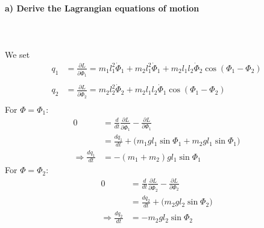 \documentclass[11 pt]{article}
\begin{document}
        \paragraph{a) Derive the Lagrangian equations of motion} \ \\
        \\
        We set 
        \begin{align}
            q_1
            &=\frac{\partial L}{\partial\dot\Phi_1}
            =m_1l_1^2\dot\Phi_1+m_2l_1^2\dot\Phi_1
            +m_2l_1l_2\dot\Phi_2\cos(\Phi_1-\Phi_2) 
            \label{eq:bla} \\
            \\ q_2
            &=\frac{\partial L}{\partial\dot\Phi_2}
            =m_2l_2^2\dot\Phi_2
              +m_2l_1l_2\dot\Phi_1\cos(\Phi_1-\Phi_2) 
            \label{eq:blu} \\
        \end{align}
        For $\Phi=\Phi_1$:
        \begin{align}
            0
            &=\frac{d}{dt}\frac{\partial L}{\partial\dot\Phi_1}
            -\frac{\partial L}{\partial\Phi_1} \\
            &=\frac{dq_1}{dt}+\bigg(
                m_1gl_1\sin{\Phi_1}+m_2gl_1\sin{\Phi_1}
            \bigg) \\
            \Rightarrow\frac{dq_1}{dt}&=-(m_1+m_2)gl_1\sin\Phi_1
        \end{align}
        For $\Phi=\Phi_2$:
        \begin{align}
            0
            &=\frac{d}{dt}\frac{\partial L}{\partial\dot\Phi_2}
            -\frac{\partial L}{\partial\Phi_2} \\
            &=\frac{dq_2}{dt}+\bigg(
                m_2gl_2\sin{\Phi_2}
            \bigg) \\
            \Rightarrow\frac{dq_2}{dt}&=-m_2gl_2\sin{\Phi_2}
        \end{align}
\end{document}
